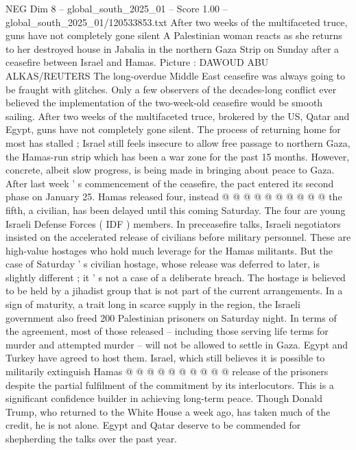 \begin{textsample}{NEG Dim 8 – global\_south\_2025\_01 – Score 1.00 – global\_south\_2025\_01/120533853.txt}  \label{ex:f8_neg_139}
After two weeks of the multifaceted truce, guns have not completely gone silent A Palestinian woman reacts as she returns to her destroyed house in Jabalia in the northern Gaza Strip on Sunday after a ceasefire between Israel and Hamas.
Picture : DAWOUD ABU ALKAS/REUTERS The long-overdue Middle East ceasefire was always going to be fraught with glitches.
Only a few observers of the decades-long conflict ever believed the implementation of the two-week-old ceasefire would be smooth sailing.
After two weeks of the multifaceted truce, brokered by the US, Qatar and Egypt, guns have not completely gone silent.
The process of returning home for most has stalled ; Israel still feels insecure to allow free passage to northern Gaza, the Hamas-run strip which has been a war zone for the past 15 months.
However, concrete, albeit slow progress, is being made in bringing about peace to Gaza.
After last week ' s commencement of the ceasefire, the pact entered its second phase on January 25.
Hamas released four, instead @ @ @ @ @ @ @ @ @ @ the fifth, a civilian, has been delayed until this coming Saturday.
The four are young Israeli Defense Forces ( IDF ) members.
In preceasefire talks, Israeli negotiators insisted on the accelerated release of civilians before military personnel.
These are high-value hostages who hold much leverage for the Hamas militants.
But the case of Saturday ' s civilian hostage, whose release was deferred to later, is slightly different ; it ' s not a case of a deliberate breach.
The hostage is believed to be held by a jihadist group that is not part of the current arrangements.
In a sign of maturity, a trait long in scarce supply in the region, the Israeli government also freed 200 Palestinian prisoners on Saturday night.
In terms of the agreement, most of those released -- including those serving life terms for murder and attempted murder -- will not be allowed to settle in Gaza.
Egypt and Turkey have agreed to host them.
Israel, which still believes it is possible to militarily extinguish Hamas @ @ @ @ @ @ @ @ @ @ release of the prisoners despite the partial fulfilment of the commitment by its interlocutors.
This is a significant confidence builder in achieving long-term peace.
Though Donald Trump, who returned to the White House a week ago, has taken much of the credit, he is not alone.
Egypt and Qatar deserve to be commended for shepherding the talks over the past year.

\end{textsample}
